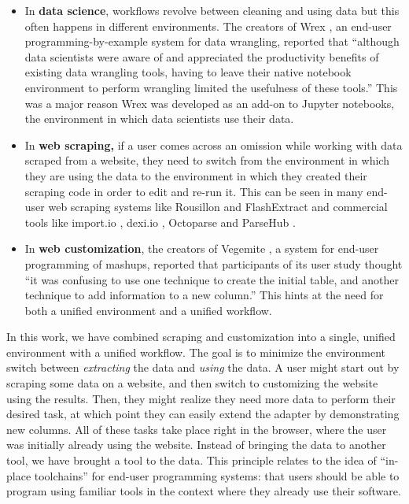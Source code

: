 \documentclass[sigconf,10pt]{acmart}
\providecommand{\tightlist}{%
  \setlength{\itemsep}{0pt}\setlength{\parskip}{0pt}}
\begin{document}
\begin{itemize}
\tightlist
\item
  In \textbf{data science}, workflows revolve between cleaning and using
  data but this often happens in different environments. The creators of
  Wrex \citep{drosos2020}, an end-user programming-by-example system for
  data wrangling, reported that ``although data scientists were aware of
  and appreciated the productivity benefits of existing data wrangling
  tools, having to leave their native notebook environment to perform
  wrangling limited the usefulness of these tools.'' This was a major
  reason Wrex was developed as an add-on to Jupyter notebooks, the
  environment in which data scientists use their data.
\item
  In \textbf{web scraping,} if a user comes across an omission while
  working with data scraped from a website, they need to switch from the
  environment in which they are using the data to the environment in
  which they created their scraping code in order to edit and re-run it.
  This can be seen in many end-user web scraping systems like Rousillon
  \citep{chasins2018}and FlashExtract \citep{le2014} and commercial
  tools like import.io \citep{import.io}, dexi.io \citep{dexi.io},
  Octoparse \citep{octoparse} and ParseHub \citep{parsehub}.
\item
  In \textbf{web customization}, the creators of Vegemite
  \citep{lin2009}, a system for end-user programming of mashups,
  reported that participants of its user study thought ``it was
  confusing to use one technique to create the initial table, and
  another technique to add information to a new column.'' This hints at
  the need for both a unified environment and a unified workflow.
\end{itemize}

In this work, we have combined scraping and customization into a single,
unified environment with a unified workflow. The goal is to minimize the
environment switch between \emph{extracting} the data and \emph{using}
the data. A user might start out by scraping some data on a website, and
then switch to customizing the website using the results. Then, they
might realize they need more data to perform their desired task, at
which point they can easily extend the adapter by demonstrating new
columns. All of these tasks take place right in the browser, where the
user was initially already using the website. Instead of bringing the
data to another tool, we have brought a tool to the data. This principle
relates to the idea of ``in-place toolchains'' \citep{zotero-1362} for
end-user programming systems: that users should be able to program using
familiar tools in the context where they already use their software.
\end{document}
